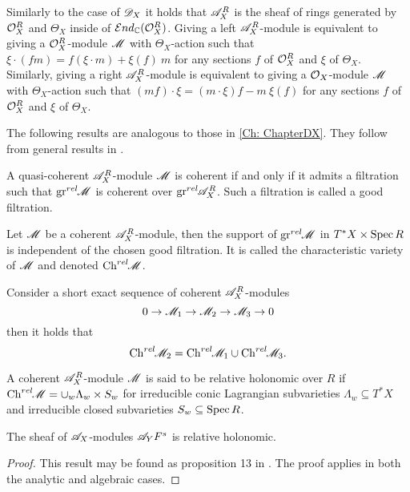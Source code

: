 Similarly to the case of $\mathscr{D}_X$ it holds that $\mathscr{A}_X^R$ is the sheaf of rings generated by $\mathcal{O}_X^R$ and $\Theta_X$ inside of $\mathcal{E}nd_{\mathbb{C}}(\mathcal{O}_X^R)$. Giving a left $\mathscr{A}_X^R$-module is equivalent to giving a $\mathcal{O}_X^R$-module $\mathscr{M}$ with $\Theta_X$-action such that
$\xi\cdot (fm) = f (\xi \cdot m)  + \xi(f)\ m  $
for any sections $f$ of $\mathcal{O}_X^R$ and $\xi$ of $\Theta_X$. Similarly, giving a right $\mathscr{A}_X^R$-module is equivalent to giving a $\mathcal{O}_X$-module $\mathscr{M}$ with $\Theta_X$-action such that $(mf)\cdot\xi = (m\cdot\xi)f - m\ \xi(f) $ for any sections $f$ of $\mathcal{O}_X^R$ and $\xi$ of $\Theta_X$.

The following results are analogous to those in \cref{Ch: ChapterDX}.
They follow from general results in \cite[Appendix III]{bjork1993analytic}.
\begin{proposition}\label{prop: CoherentAndGoodFiltration}
    A quasi-coherent $\mathscr{A}_X^R$-module $\mathscr{M}$ is coherent if and only if it admits a filtration such that $\operatorname{gr}^{rel}\mkern-5mu \mathscr{M}$ is coherent over $\operatorname{gr}^{rel}\mkern-5mu \mathscr{A}_X^R$. Such a filtration is called a good filtration.
\end{proposition}
\begin{proposition}
    Let $\mathscr{M}$ be a coherent $\mathscr{A}_X^R$-module, then the support of $\operatorname{gr}^{rel}\mkern-5mu \mathscr{M}$ in $T^*X \times \operatorname{Spec} R$ is independent of the chosen good filtration. It is called the characteristic variety of $\mathscr{M}$ and denoted $\operatorname{Ch}^{rel}\mkern-5mu \mathscr{M}$.
\end{proposition}
\begin{lemma}\label{lem: SESBehaviourA}
    Consider a short exact sequence of coherent $\mathscr{A}_X^R$-modules
    $$0\to \mathscr{M}_1 \to \mathscr{M}_2 \to\mathscr{M}_3 \to 0 $$
    then it holds that
    $$\operatorname{Ch}^{rel}\mkern-5mu \mathscr{M}_2 = \operatorname{Ch}^{rel}\mkern-5mu \mathscr{M}_1 \cup \operatorname{Ch}^{rel}\mkern-5mu \mathscr{M}_3. $$
\end{lemma}

A coherent $\mathscr{A}_X^R$-module $\mathscr{M}$ is said to be relative holonomic over $R$ if $\operatorname{Ch}^{rel}\mkern-5mu \mathscr{M} = \cup_w \Lambda_w \times S_w$
for irreducible conic Lagrangian subvarieties $\Lambda_w\subseteq T^*X$ and irreducible closed subvarieties $S_w\subseteq \operatorname{Spec} R$.
\begin{lemma}\label{lem: RelHolGs}
  The sheaf of $\mathscr{A}_X$-modules $\mathscr{A}_Y F^s$ is relative holonomic.
\end{lemma}
\begin{proof}
  This result may be found as proposition 13 in \cite{maisonobe2016filtration}. The proof applies in both the analytic and algebraic cases.
\end{proof}

